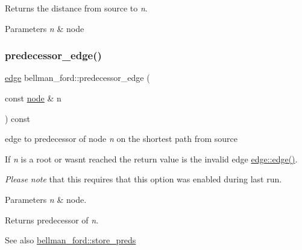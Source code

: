 Returns the distance from source to {\itshape n}. 


\begin{DoxyParams}{Parameters}
{\em n} & node \\
\hline
\end{DoxyParams}
\mbox{\label{classbellman__ford_a39f93b0b1e427cf26059fa6141c6f61c}} 
\subsubsection{\texorpdfstring{predecessor\+\_\+edge()}{predecessor\_edge()}}
{\footnotesize\ttfamily \mbox{\hyperlink{classedge}{edge}} bellman\+\_\+ford\+::predecessor\+\_\+edge (\begin{DoxyParamCaption}\item[{const \mbox{\hyperlink{classnode}{node}} \&}]{n }\end{DoxyParamCaption}) const\hspace{0.3cm}{\ttfamily [inline]}}



edge to predecessor of node {\itshape n} on the shortest path from source 

If {\itshape n} is a root or wasn\textquotesingle{}t reached the return value is the invalid edge \mbox{\hyperlink{classedge_a41859d2473a15e24255d7bc0de1f49b4}{edge\+::edge()}}.

{\itshape Please} {\itshape note} that this requires that this option was enabled during last run.


\begin{DoxyParams}{Parameters}
{\em n} & node. \\
\hline
\end{DoxyParams}
\begin{DoxyReturn}{Returns}
predecessor of {\itshape n}. 
\end{DoxyReturn}
\begin{DoxySeeAlso}{See also}
\mbox{\hyperlink{classbellman__ford_aac87169a3cf4f95477ce215a0cb7a12b}{bellman\+\_\+ford\+::store\+\_\+preds}} 
\end{DoxySeeAlso}
\mbox{\label{classbellman__ford_a403e286ec8cbe3c30a7a729c5041155e}} 
